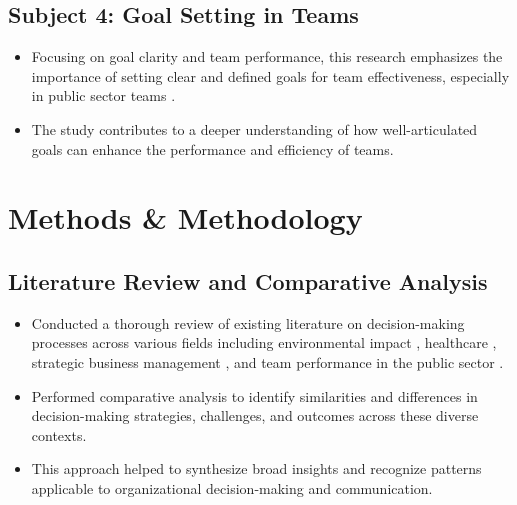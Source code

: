 \documentclass[12pt]{article}
\begin{document}
\subsection{Subject 4: Goal Setting in Teams}
\begin{itemize}
  \item Focusing on goal clarity and team performance, this research emphasizes the importance of setting clear and defined goals for team effectiveness, especially in public sector teams \cite{reference5}.
  \item The study contributes to a deeper understanding of how well-articulated goals can enhance the performance and efficiency of teams.
\end{itemize}

\newpage

\section{Methods \& Methodology}

\subsection{Literature Review and Comparative Analysis}
\begin{itemize}
  \item Conducted a thorough review of existing literature on decision-making processes across various fields including environmental impact \cite{reference1}, healthcare \cite{reference2}, strategic business management \cite{reference4}, and team performance in the public sector \cite{reference5}.
  \item Performed comparative analysis to identify similarities and differences in decision-making strategies, challenges, and outcomes across these diverse contexts.
  \item This approach helped to synthesize broad insights and recognize patterns applicable to organizational decision-making and communication.
\end{itemize}
\end{document}
